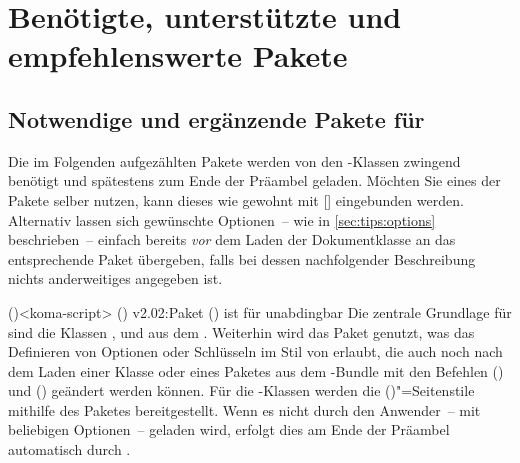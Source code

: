\chapter{%
  Benötigte, unterstützte und empfehlenswerte Pakete%
  \label{sec:packages}%
}
\section{%
  Notwendige und ergänzende Pakete für \TUDScript%
  \label{sec:packages:needed}%
}
%
Die im Folgenden aufgezählten Pakete werden von den \TUDScript-Klassen zwingend 
benötigt und spätestens zum Ende der Präambel geladen. Möchten Sie eines der 
Pakete selber nutzen, kann dieses wie gewohnt mit
[] eingebunden werden. 
Alternativ lassen sich gewünschte Optionen~-- wie in \autoref{sec:tips:options} 
beschrieben~-- einfach bereits \emph{vor} dem Laden der Dokumentklasse an das 
entsprechende Paket übergeben, falls bei dessen nachfolgender Beschreibung 
nichts anderweitiges angegeben ist.
%
\begin{DeclareEntity}{}
\begin{packages}
\item[%
  typearea,scrbase,scrlayer-scrpage,scrletter,scrextend%
]()<koma-script>
  \ChangedAt(){%
    v2.02:Paket () ist für 
    \TUDScript unabdingbar%
  }%
  Die zentrale Grundlage für \TUDScript sind die Klassen , 
   und  aus dem . 
  Weiterhin wird das Paket  genutzt, was das Definieren von 
  Optionen oder Schlüsseln im Stil von \KOMAScript erlaubt, die auch noch nach 
  dem Laden einer Klasse oder eines Paketes aus dem \TUDScript-Bundle mit den 
  Befehlen () und () geändert werden können. 
  Für die \TUDScript-Klassen werden die ()"=Seitenstile 
  mithilfe des Paketes  bereitgestellt. Wenn es nicht 
  durch den Anwender~-- mit beliebigen Optionen~-- geladen wird, erfolgt dies 
  am Ende der Präambel automatisch durch \TUDScript.
\end{packages}
\end{DeclareEntity}
